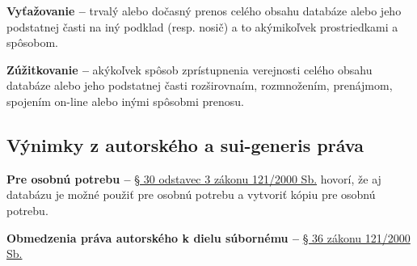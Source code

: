 \textbf{Vyťažovanie \--- } trvalý alebo dočasný prenos celého obsahu databáze alebo jeho podstatnej časti na iný podklad (resp. nosič) a to akýmikoľvek prostriedkami a spôsobom.

\textbf{Zúžitkovanie \--- } akýkoľvek spôsob zprístupnenia verejnosti celého obsahu databáze alebo jeho podstatnej časti rozširovnaím, rozmnožením, prenájmom, spojením on-line alebo inými spôsobmi prenosu.

\subsection{Výnimky z autorského a sui-generis práva}

\textbf{Pre osobnú potrebu \---} \href{https://www.zakonyprolidi.cz/cs/2000-121#:~:text=uziti%20pocitacoveho%20programu%20ci%20elektronicke%20databaze%20i%20pro%20osobni%20potrebu}{§ 30 odstavec 3 zákonu 121/2000 Sb.} hovorí, že aj databázu je možné použiť pre osobnú potrebu a vytvoriť kópiu pre osobnú potrebu.

\textbf{Obmedzenia práva autorského k dielu súbornému \---} \href{https://www.zakonyprolidi.cz/cs/2000-121#:~:text=k%20d%C3%ADlu%20souborn%C3%A9mu%2C-,ktere%20je%20databazi,-%2C%20nezasahuje%20opr%C3%A1vn%C4%9Bn%C3%BD%20u%C5%BEivatel}{§ 36 zákonu 121/2000 Sb.}

